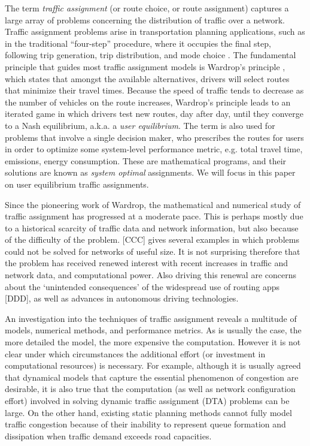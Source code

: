 The term \textit{traffic assignment} (or route choice, or route assignment) captures a large array of problems concerning the distribution of traffic over a network. Traffic assignment problems arise in transportation planning applications, such as in the traditional ``four-step'' procedure, where it occupies the final step, following trip generation, trip distribution, and mode choice \cite{mcnally2007four}.  The fundamental principle that guides most traffic assignment models is Wardrop's principle \cite{wardrop1952some}, which states that amongst the available alternatives, drivers will select routes that minimize their travel times. Because the speed of traffic tends to decrease as the number of vehicles on the route increases, Wardrop's principle leads to an iterated game in which drivers test new routes, day after day, until they converge to a Nash equilibrium, a.k.a. a \textit{user equilibrium}. The term is also used for problems that involve a single decision maker, who prescribes the routes for users in order to optimize some system-level performance metric, e.g. total travel time, emissions, energy consumption. These are mathematical programs, and their solutions are known as \textit{system optimal} assignments. We will focus in this paper on user equilibrium traffic assignments.

Since the pioneering work of Wardrop, the mathematical and numerical study of traffic assignment has progressed at a moderate pace. This is perhaps mostly due to a historical scarcity of traffic data and network information, but also because of the difficulty of the problem. [CCC] gives several examples in which problems could not be solved for networks of useful size. It is not surprising therefore that the problem has received renewed interest with recent increases in traffic and network data, and computational power. Also driving this renewal are concerns about the `unintended consequences' of the widespread use of routing apps [DDD], as well as advances in autonomous driving technologies.

An investigation into the techniques of traffic assignment reveals a multitude of models, numerical methods, and performance metrics. As is usually the case, the more detailed the model, the more expensive the computation. However it is not clear under which circumstances the additional effort (or investment in computational resources) is necessary. For example, although it is usually agreed that dynamical models that capture the essential phenomenon of congestion are desirable, it is also true that the computation (as well as network configuration effort) involved in solving dynamic traffic assignment (DTA) problems can be large. On the other hand, existing static planning methods cannot fully model traffic congestion because of their inability to represent queue formation and dissipation when traffic demand exceeds road capacities\cite{nie2010solving}. 

